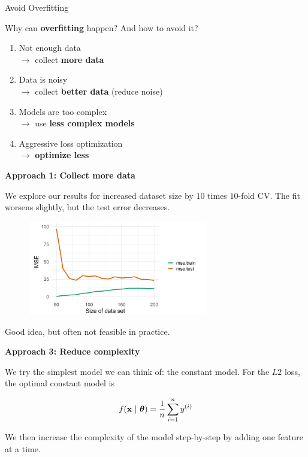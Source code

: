\begin{vbframe}{Avoid Overfitting}

Why can \textbf{overfitting} happen? And how to avoid it?

\begin{enumerate}
\item Not enough data \\
$\to$ collect \textbf{more data}
\item Data is noisy \\
$\to$ collect \textbf{better data} (reduce noise)
\item Models are too complex \\
$\to$ use \textbf{less complex models}
\item Aggressive loss optimization \\
$\to$ \textbf{optimize less}
\end{enumerate}


\framebreak

\textbf{Approach 1: Collect more data}

\lz

We explore our results for increased dataset size by $10$ times $10$-fold CV.
The fit worsens slightly, but the test error decreases.

\begin{figure}
\includegraphics[width=0.7\textwidth]{figure_man/avoid-overfitting01.png}\\
\end{figure}

Good idea, but often not feasible in practice.

\framebreak

\textbf{Approach 3: Reduce complexity}

\lz

We try the simplest model we can think of: the constant model. For the $L2$ loss, the optimal constant model is

$$
f(\mathbf{x} ~|~ \bm{\theta}) = \frac{1}{n}\sum\limits_{i=1}^n y^{(i)}
$$

We then increase the complexity of the model step-by-step by adding one feature at a time.


\end{vbframe}
